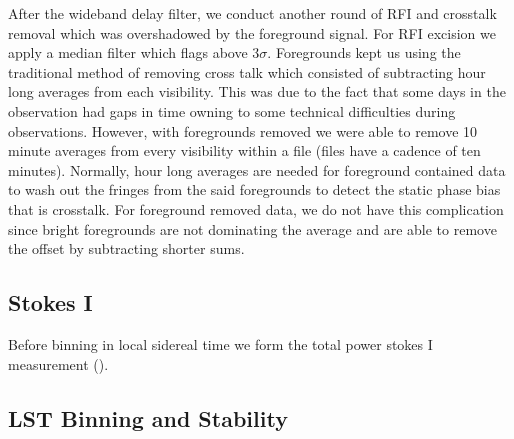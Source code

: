 \documentclass[twocolumn,numberedappendix]{emulateapj} \shorttitle{PSA64}
\begin{document}
After the wideband delay filter, we conduct another round of RFI and crosstalk
removal which was overshadowed by the foreground signal. For RFI excision we
apply a median filter which flags above $3\sigma$. Foregrounds kept us using the
traditional method of removing cross talk which consisted of subtracting hour
long averages from each visibility. This was due to the fact that some days in
the observation had gaps in time owning to some technical difficulties during
observations. However, with foregrounds removed we were able to remove 10 minute
averages from every visibility within a file (files have a cadence of ten
minutes). Normally, hour long averages are needed for foreground contained data
to wash out the fringes from the said foregrounds to detect the static phase
bias that is crosstalk. For foreground removed data, we do not have this
complication since bright foregrounds are not dominating the average and are
able to remove the offset by subtracting shorter sums.

\subsection{Stokes I}
Before binning in local sidereal time we form the total power stokes I
measurement (\cite{moore_et_al2013}). 


\subsection{LST Binning and Stability}\label{sec:lstbin}
\end{document}
